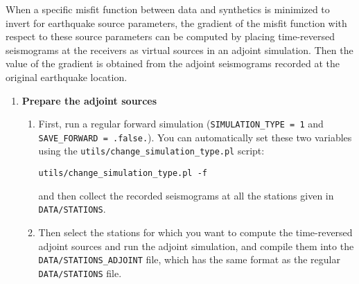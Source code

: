 When a specific misfit function between data and synthetics is minimized to invert
for earthquake source parameters, the gradient of the misfit function
with respect to these source parameters can be computed by placing
time-reversed seismograms at the receivers as virtual sources
in an adjoint simulation. Then the value of the gradient is obtained
from the adjoint seismograms recorded at the original earthquake location.
\begin{enumerate}
\item \textbf{Prepare the adjoint sources} \label{enu:Prepare-the-adjoint}

\begin{enumerate}
\item First, run a regular forward simulation (\texttt{SIMULATION\_TYPE =
1} and \texttt{SAVE\_FORWARD = .false.}). You can automatically set
these two variables using the \texttt{\small utils/change\_simulation\_type.pl}{\small{}
script:}{\small \par}
\begin{verbatim}
utils/change_simulation_type.pl -f
\end{verbatim}

and then collect the recorded seismograms at all the stations given
in \texttt{DATA/STATIONS}.

\item Then select the stations for which you want to compute the time-reversed
adjoint sources and run the adjoint simulation, and compile them into
the \texttt{DATA/STATIONS\_ADJOINT} file, which has the same format
as the regular \texttt{DATA/STATIONS} file.


\end{enumerate}
\end{enumerate}
